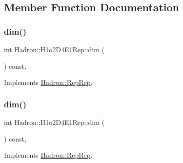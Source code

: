 \subsection{Member Function Documentation}
\mbox{\label{structHadron_1_1H1o2D4E1Rep_a835d31398fa4c01b94dad4fd64e3447c}} 
\subsubsection{\texorpdfstring{dim()}{dim()}\hspace{0.1cm}{\footnotesize\ttfamily [1/5]}}
{\footnotesize\ttfamily int Hadron\+::\+H1o2\+D4\+E1\+Rep\+::dim (\begin{DoxyParamCaption}{ }\end{DoxyParamCaption}) const\hspace{0.3cm}{\ttfamily [inline]}, {\ttfamily [virtual]}}



Implements \mbox{\hyperlink{structHadron_1_1RepRep_a92c8802e5ed7afd7da43ccfd5b7cd92b}{Hadron\+::\+Rep\+Rep}}.

\mbox{\label{structHadron_1_1H1o2D4E1Rep_a835d31398fa4c01b94dad4fd64e3447c}} 
\subsubsection{\texorpdfstring{dim()}{dim()}\hspace{0.1cm}{\footnotesize\ttfamily [2/5]}}
{\footnotesize\ttfamily int Hadron\+::\+H1o2\+D4\+E1\+Rep\+::dim (\begin{DoxyParamCaption}{ }\end{DoxyParamCaption}) const\hspace{0.3cm}{\ttfamily [inline]}, {\ttfamily [virtual]}}



Implements \mbox{\hyperlink{structHadron_1_1RepRep_a92c8802e5ed7afd7da43ccfd5b7cd92b}{Hadron\+::\+Rep\+Rep}}.

\mbox{\label{structHadron_1_1H1o2D4E1Rep_a835d31398fa4c01b94dad4fd64e3447c}} 
